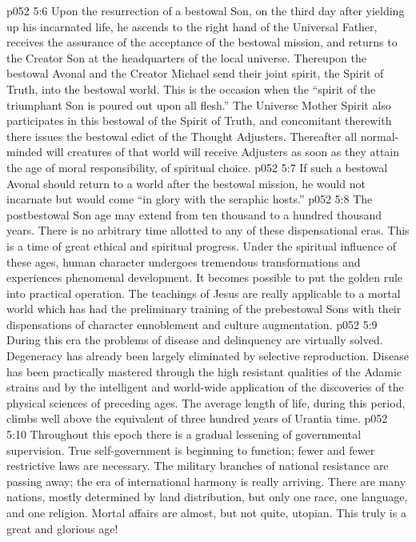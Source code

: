 \vs p052 5:6 \pc Upon the resurrection of a bestowal Son, on the third day after yielding up his incarnated life, he ascends to the right hand of the Universal Father, receives the assurance of the acceptance of the bestowal mission, and returns to the Creator Son at the headquarters of the local universe. Thereupon the bestowal Avonal and the Creator Michael send their joint spirit, the Spirit of Truth, into the bestowal world. This is the occasion when the “spirit of the triumphant Son is poured out upon all flesh.” The Universe Mother Spirit also participates in this bestowal of the Spirit of Truth, and concomitant therewith there issues the bestowal edict of the Thought Adjusters. Thereafter all normal\hyp{}minded will creatures of that world will receive Adjusters as soon as they attain the age of moral responsibility, of spiritual choice.
\vs p052 5:7 If such a bestowal Avonal should return to a world after the bestowal mission, he would not incarnate but would come “in glory with the seraphic hosts.”
\vs p052 5:8 \pc The postbestowal Son age may extend from ten thousand to a hundred thousand years. There is no arbitrary time allotted to any of these dispensational eras. This is a time of great ethical and spiritual progress. Under the spiritual influence of these ages, human character undergoes tremendous transformations and experiences phenomenal development. It becomes possible to put the golden rule into practical operation. The teachings of Jesus are really applicable to a mortal world which has had the preliminary training of the prebestowal Sons with their dispensations of character ennoblement and culture augmentation.
\vs p052 5:9 During this era the problems of disease and delinquency are virtually solved. Degeneracy has already been largely eliminated by selective reproduction. Disease has been practically mastered through the high resistant qualities of the Adamic strains and by the intelligent and world\hyp{}wide application of the discoveries of the physical sciences of preceding ages. The average length of life, during this period, climbs well above the equivalent of three hundred years of Urantia time.
\vs p052 5:10 Throughout this epoch there is a gradual lessening of governmental supervision. True self\hyp{}government is beginning to function; fewer and fewer restrictive laws are necessary. The military branches of national resistance are passing away; the era of international harmony is really arriving. There are many nations, mostly determined by land distribution, but only one race, one language, and one religion. Mortal affairs are almost, but not quite, utopian. This truly is a great and glorious age!
